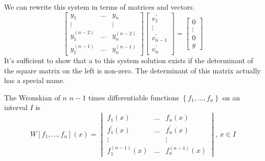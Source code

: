 \noindent
We can rewrite this system in terms of matrices and vectors.
\begin{equation*}
	\begin{bmatrix}
		y_1 & \ldots & y_n \\
		\vdots & & \vdots\\
		y_1^{(n-2)} & \ldots & y_n^{(n-2)} \\
		y_1^{(n-1)} & \ldots & y_n^{(n-1)}
	\end{bmatrix} \begin{bmatrix}
		v_1^\prime \\
		\vdots \\
		v_{n-1}^\prime \\
		v_n^\prime
	\end{bmatrix} = \begin{bmatrix}
		0 \\
		\vdots \\
		0 \\
		g
	\end{bmatrix}
\end{equation*}
It's sufficient to show that a to this system solution exists if the determinant of the square matrix on the left is non-zero. The determinant of this matrix actually has a special name.

\begin{definition}
	The Wronskian of $n$ $n-1$ times differentiable functions $\left\{f_1, \ldots, f_n\right\}$ on an interval $I$ is
	\begin{equation*}
		W[f_1, \ldots, f_n](x) = \begin{vmatrix}
			f_1(x) & \ldots & f_n(x) \\
			f_1^\prime(x) & \ldots & f_n^\prime(x) \\
			\vdots &        & \vdots \\
			f_1^{(n-1)}(x) & \ldots & f_n^{(n-1)}(x)
		\end{vmatrix} \text{, } x \in I
	\end{equation*}
\end{definition} 

